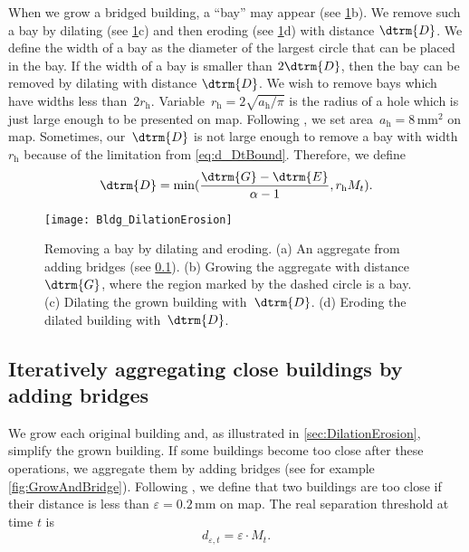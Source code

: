 When we grow a bridged building,
a ``bay'' may appear (see \fig\ref{fig:RemoveBay}b).
We remove such a bay by dilating (see \fig\ref{fig:RemoveBay}c)
and then eroding (see \fig\ref{fig:RemoveBay}d) with distance 
$\dtrm{D}$.
We define the width of a bay as the diameter of the largest 
circle 
that can be placed in the bay.
If the width of a bay is smaller than $2\dtrm{D}$, 
then the bay can be removed by dilating with distance 
$\dtrm{D}$.
We wish to remove bays 
which have widths less than~$2 r_\mathrm{h}$.
Variable~$r_\mathrm{h}= 2\sqrt
{ a_\mathrm{h}/ \pi }$
is the radius of a hole 
which is just large enough to be presented on map.
Following \citep{Chaudhry2008}, 
we set area~$a_\mathrm{h} = 8\,\mathrm{mm}^2$ on map.
Sometimes, our~$\dtrm{D}$ is not large enough to remove a bay 
with width~$r_\mathrm{h}$
because of the limitation from \eq\ref{eq:d_DtBound}.
Therefore, we define
\begin{equation}
\label{eq:d_Dt}
\dtrm{D} =\min (\frac{\dtrm{G}-\dtrm{E}}{\alpha - 1}, 
r_\mathrm{h} M_t) .
\end{equation}


\begin{figure}[tb]
	\centering
	\texttt{[image: Bldg\_DilationErosion]}
	\caption{Removing a bay by dilating and eroding.
		(a) An aggregate from adding bridges 
		(see \sect\ref{sec:Aggregate}).
		(b) Growing the aggregate with 
		distance~$\dtrm{G}$,
		where the region marked by the dashed circle is a bay.
		(c) Dilating the grown building with~$\dtrm{D}$.
		(d) Eroding the dilated building with~$\dtrm{D}$.
	}
	\label{fig:RemoveBay}
\end{figure}


\subsection{Iteratively aggregating close buildings by adding 
bridges}
\label{sec:Aggregate}


We grow each original building and, as illustrated in 
\sect\ref{sec:DilationErosion}, simplify the grown building.
If some buildings become too close after these operations,
we aggregate them by adding bridges
(see for example \fig\ref{fig:GrowAndBridge}).
Following \citet{Stoter2009}, 
we define that two buildings are too close if their distance is 
less than
$\varepsilon= 0.2\,\mathrm{mm}$ on map.
The real separation threshold at time $t$ is
\begin{equation}
\label{eq:d_epsilont}
d_{\varepsilon, t} = \varepsilon \cdot M_t.
\end{equation}

